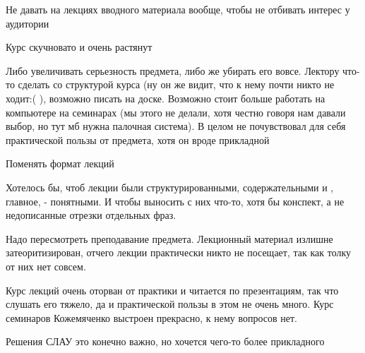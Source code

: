         \begin{commentbox}
            Не давать на лекциях вводного материала вообще, чтобы не отбивать интерес у аудитории
        \end{commentbox}

        \begin{commentbox}
            Курс скучновато и очень растянут 
        \end{commentbox}

        \begin{commentbox}
            Либо увеличивать серьезность предмета, либо же убирать его вовсе. Лектору что-то сделать со структурой курса (ну он же видит, что к нему почти никто не ходит:( ), возможно писать на доске. Возможно стоит больше работать на компьютере на семинарах (мы этого не делали, хотя честно говоря нам давали выбор, но тут мб нужна палочная система).  В целом не почувствовал для себя практической пользы от предмета, хотя он вроде прикладной
        \end{commentbox}

        \begin{commentbox}
            Поменять формат лекций
        \end{commentbox}

        \begin{commentbox}
            Хотелось бы, чтоб лекции были структурированными, содержательными и , главное, - понятными. И чтобы выносить с них что-то, хотя бы конспект, а не недописанные отрезки отдельных фраз.
        \end{commentbox}

        \begin{commentbox}
            Надо пересмотреть преподавание предмета. Лекционный материал излишне затеоритизирован, отчего лекции практически никто не посещает, так как толку от них нет совсем.
        \end{commentbox}

        \begin{commentbox}
            Курс лекций очень оторван от практики и читается по презентациям, так что слушать его тяжело, да и практической пользы в этом не очень много. Курс семинаров Кожемяченко выстроен прекрасно, к нему вопросов нет.
        \end{commentbox}

        \begin{commentbox}
            Решения СЛАУ это конечно важно, но хочется чего-то более прикладного
        \end{commentbox}

